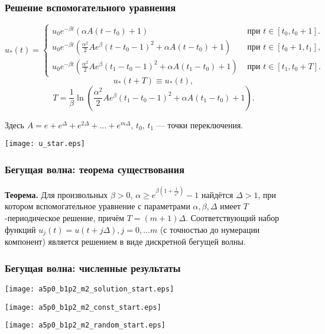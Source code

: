 \begin{frame}
	\frametitle{Решение вспомогательного уравнения}
	\small
	\begin{equation*}
		\label{eq:u_star}
		u_*(t)=
		\begin{cases}
			u_0 e^{-\beta t}(\alpha A(t-t_0)+1) & \text{ при } t\in[t_0,t_0+1].
			\\
			u_0 e^{-\beta t}\left(\frac{\alpha^2}{2}Ae^{\beta}(t-t_0-1)^2+\alpha A(t-t_0)+1\right) & \text{ при } t\in[t_0+1,t_1],
			\\
			u_0 e^{-\beta t}\left(\frac{\alpha^2}{2}Ae^{\beta}(t_1-t_0-1)^2+\alpha A(t_1-t_0)+1\right) & \text{ при } t\in[t_1,t_0+T].
		\end{cases}
	\end{equation*}
	\normalsize
	\[
	u_*(t+T)\equiv u_*(t),
	\]
	\begin{equation*}
		\label{eq:mg_period_T}
		T = \dfrac{1}{\beta}\ln\left( \frac{\alpha^2}{2}Ae^{\beta}(t_1-t_0-1)^2+\alpha A(t_1-t_0)+1\right). 
	\end{equation*}
	
	Здесь $A = e + e^{\Delta} + e^{2\Delta} + \ldots + e^{m\Delta}$, $t_0$, $t_1$ --- точки переключения.
	
	\begin{center}
		\texttt{[image: u\_star.eps]}
	
	\end{center}
\end{frame}

\begin{frame}
	\frametitle{Бегущая волна: теорема существования}
	
	\textbf{Теорема.} 
	Для произвольных $\beta > 0$, $\alpha \geqslant e^{\beta\left(1 + \frac{1}{e^{\beta}}\right)} - 1$ найдётся $\Delta > 1$, при котором вспомогательное уравнение с параметрами $\alpha, \beta, \Delta$ имеет $T$-периодическое решение, причём $T = (m + 1) \Delta$. Соответствующий набор функций $u_j(t) = u(t + j \Delta), j = 0, \ldots m$ (с точностью до нумерации компонент) является решением в виде дискретной бегущей волны.
\end{frame}

\begin{frame}
	\frametitle{Бегущая волна: численные результаты}
	
	\begin{center}
		\texttt{[image: a5p0\_b1p2\_m2\_solution\_start.eps]}
		
		\texttt{[image: a5p0\_b1p2\_m2\_const\_start.eps]}
		
		\texttt{[image: a5p0\_b1p2\_m2\_random\_start.eps]}
	\end{center}
\end{frame}

